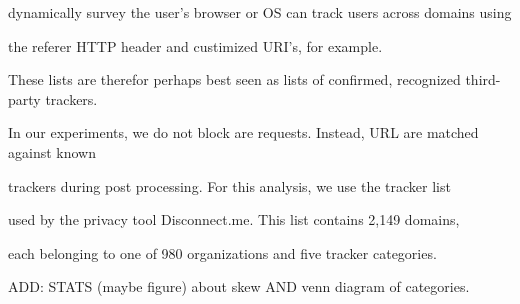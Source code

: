 \documentclass{sig-alternate-10pt}
\begin{document}
dynamically survey the user’s browser or OS can track users across domains using

the referer  HTTP header and custimized URI's, for example.

These lists are therefor perhaps best seen as lists of confirmed, recognized third-party trackers.



In our experiments, we do not block are requests.  Instead, URL are matched against known 

trackers during post processing.  For this analysis, we use the tracker list

used by the privacy tool Disconnect.me.  This list contains 2,149 domains,

each belonging to one of 980 organizations and five tracker categories.



ADD: STATS (maybe figure) about skew AND venn diagram of categories.















\end{document}
